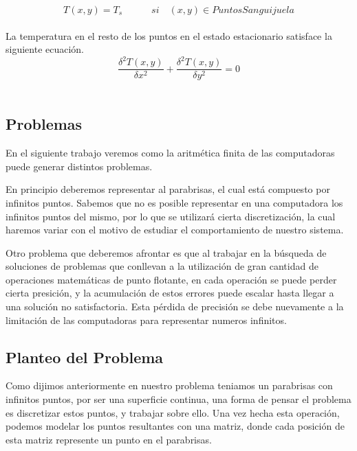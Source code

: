 \documentclass{article}
\begin{document}
\begin{equation}
T(x,y)=T_s	\quad	\quad	\quad si \quad (x,y)\in PuntosSanguijuela
\end{equation}\\




La temperatura en el resto de los puntos en el estado estacionario satisface la siguiente ecuación.\\

\begin{equation}
\frac{\delta ^2 T(x,y)}{\delta x^2}+\frac{\delta ^2 T(x,y)}{\delta y^2}=0 
\end{equation}\\





\subsection{Problemas}

En el siguiente trabajo veremos como la aritmética finita de las computadoras puede generar distintos problemas.

En principio deberemos representar al parabrisas, el cual está compuesto por infinitos puntos. Sabemos que no es posible representar en una computadora los infinitos puntos del mismo, por lo que se utilizará cierta discretización, la cual haremos variar con el motivo de estudiar el comportamiento de nuestro sistema.

Otro problema que deberemos afrontar es que al trabajar en la búsqueda de soluciones de problemas que conllevan a la utilización de gran cantidad de operaciones matemáticas de punto flotante, en cada operación se puede perder cierta presición, y la acumulación de estos errores puede escalar hasta llegar a una solución no satisfactoria. Esta pérdida de precisión se debe nuevamente a la limitación de las computadoras para representar numeros infinitos.


\subsection{Planteo del Problema}
Como dijimos anteriormente en nuestro problema teniamos un parabrisas con infinitos puntos, por ser una superficie continua, una forma de pensar el problema es discretizar estos puntos, y trabajar sobre ello. Una vez hecha esta operación, podemos modelar los puntos resultantes con una matriz, donde cada posición de esta matriz represente un punto en el parabrisas.
\end{document}

